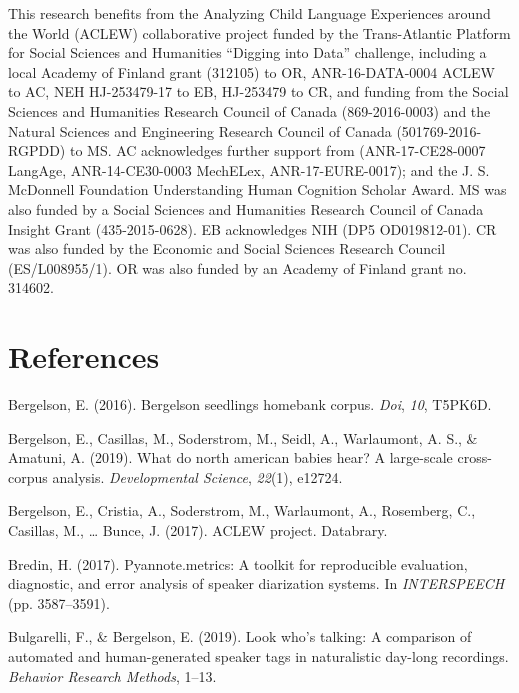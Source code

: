\documentclass[english,table,man,floatsintext]{apa6}
\begin{document}
This research benefits from the Analyzing Child Language Experiences around the World (ACLEW) collaborative project funded by the Trans-Atlantic Platform for Social Sciences and Humanities \enquote{Digging into Data} challenge, including a local Academy of Finland grant (312105) to OR, ANR-16-DATA-0004 ACLEW to AC, NEH HJ-253479-17 to EB, HJ-253479 to CR, and funding from the Social Sciences and Humanities Research Council of Canada (869-2016-0003) and the Natural Sciences and Engineering Research Council of Canada (501769-2016-RGPDD) to MS. AC acknowledges further support from (ANR-17-CE28-0007 LangAge, ANR-14-CE30-0003 MechELex, ANR-17-EURE-0017); and the J. S. McDonnell Foundation Understanding Human Cognition Scholar Award. MS was also funded by a Social Sciences and Humanities Research Council of Canada Insight Grant (435-2015-0628). EB acknowledges NIH (DP5 OD019812-01). CR was also funded by the Economic and Social Sciences Research Council (ES/L008955/1). OR was also funded by an Academy of Finland grant no. 314602.

\newpage

\hypertarget{references}{%
\section{References}\label{references}}

\setlength{\parindent}{-0.5in}
\setlength{\leftskip}{0.5in}

\hypertarget{refs}{}
\leavevmode\hypertarget{ref-bergelson2016bergelson}{}%
Bergelson, E. (2016). Bergelson seedlings homebank corpus. \emph{Doi}, \emph{10}, T5PK6D.

\leavevmode\hypertarget{ref-bergelson2019north}{}%
Bergelson, E., Casillas, M., Soderstrom, M., Seidl, A., Warlaumont, A. S., \& Amatuni, A. (2019). What do north american babies hear? A large-scale cross-corpus analysis. \emph{Developmental Science}, \emph{22}(1), e12724.

\leavevmode\hypertarget{ref-bergelson2017}{}%
Bergelson, E., Cristia, A., Soderstrom, M., Warlaumont, A., Rosemberg, C., Casillas, M., \ldots{} Bunce, J. (2017). ACLEW project. Databrary.

\leavevmode\hypertarget{ref-bredin2017pyannote}{}%
Bredin, H. (2017). Pyannote.metrics: A toolkit for reproducible evaluation, diagnostic, and error analysis of speaker diarization systems. In \emph{INTERSPEECH} (pp. 3587--3591).

\leavevmode\hypertarget{ref-bulgarelli2019}{}%
Bulgarelli, F., \& Bergelson, E. (2019). Look who's talking: A comparison of automated and human-generated speaker tags in naturalistic day-long recordings. \emph{Behavior Research Methods}, 1--13.
\end{document}
